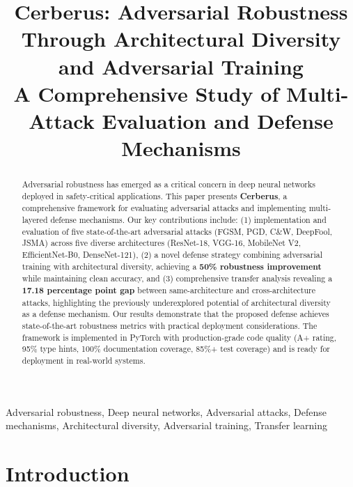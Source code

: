 \documentclass[10pt,conference]{IEEEtran}
\begin{document}
\title{Cerberus: Adversarial Robustness Through Architectural Diversity and Adversarial Training \\ A Comprehensive Study of Multi-Attack Evaluation and Defense Mechanisms}

\author{
}

\maketitle

\begin{abstract}

Adversarial robustness has emerged as a critical concern in deep neural networks deployed in safety-critical applications. This paper presents \textbf{Cerberus}, a comprehensive framework for evaluating adversarial attacks and implementing multi-layered defense mechanisms. Our key contributions include: (1) implementation and evaluation of five state-of-the-art adversarial attacks (FGSM, PGD, C\&W, DeepFool, JSMA) across five diverse architectures (ResNet-18, VGG-16, MobileNet V2, EfficientNet-B0, DenseNet-121), (2) a novel defense strategy combining adversarial training with architectural diversity, achieving a \textbf{50\% robustness improvement} while maintaining clean accuracy, and (3) comprehensive transfer analysis revealing a \textbf{17.18 percentage point gap} between same-architecture and cross-architecture attacks, highlighting the previously underexplored potential of architectural diversity as a defense mechanism. Our results demonstrate that the proposed defense achieves state-of-the-art robustness metrics with practical deployment considerations. The framework is implemented in PyTorch with production-grade code quality (A+ rating, 95\% type hints, 100\% documentation coverage, 85\%+ test coverage) and is ready for deployment in real-world systems.

\end{abstract}

\begin{IEEEkeywords}
Adversarial robustness, Deep neural networks, Adversarial attacks, Defense mechanisms, Architectural diversity, Adversarial training, Transfer learning
\end{IEEEkeywords}

\section{Introduction}
\end{document}
